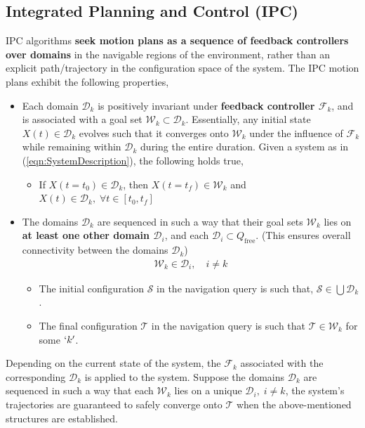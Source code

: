 \documentclass{article}
\begin{document}
    \subsection{Integrated Planning and Control (IPC)}
    IPC algorithms \textbf{seek motion plans as a sequence of feedback controllers over domains} in the navigable regions of the environment, rather than an explicit path/trajectory in the configuration space of the system. The IPC motion plans exhibit the following properties,
    \begin{itemize}
        \item Each domain $\mathcal{D}_k$ is positively invariant under \textbf{feedback controller $\mathcal{F}_k$}, and is associated with a goal set $\mathcal{W}_k \subset \mathcal{D}_k$. Essentially, any initial state $X(t)\in \mathcal{D}_k$ evolves such that it converges onto $\mathcal{W}_k$ under the influence of $\mathcal{F}_k$ while remaining within $\mathcal{D}_k$ during the entire duration. Given a system as in (\ref{eqn:SystemDescription}), the following holds true,
        \begin{itemize}
            \item If $X(t=t_0) \in \mathcal{D}_k$, then $X(t=t_f) \in \mathcal{W}_k$ and $X(t)\in \mathcal{D}_k, \;\forall t \in [t_0,t_f]$
        \end{itemize}
        \item The domains $\mathcal{D}_k$ are sequenced in such a way that their goal sets $\mathcal{W}_k$ lies on \textbf{at least one other domain $\mathcal{D}_i$}, and each $\mathcal{D}_i \subset{Q}_{\text{free}}$. (This ensures overall connectivity between the domains $\mathcal{D}_k$)
        \begin{align*}
            \mathcal{W}_k \in \mathcal{D}_i, \quad i \neq k
        \end{align*}
        \begin{itemize}
            \item The initial configuration $\mathcal{S}$ in the navigation query is such that, $\mathcal{S}\in \bigcup \mathcal{D}_k$.
            \item The final configuration $\mathcal{T}$ in the navigation query is such that $\mathcal{T} \in \mathcal{W}_k$ for some $`k'$.
        \end{itemize}
    \end{itemize}
    Depending on the current state of the system, the $\mathcal{F}_k$ associated with the corresponding $\mathcal{D}_k$ is applied to the system. Suppose the domains $\mathcal{D}_k$ are sequenced in such a way that each $\mathcal{W}_k$ lies on a unique $\mathcal{D}_i, \; i\neq k$, the system's trajectories are guaranteed to safely converge onto $\mathcal{T}$ when the above-mentioned structures are established.
\end{document}
